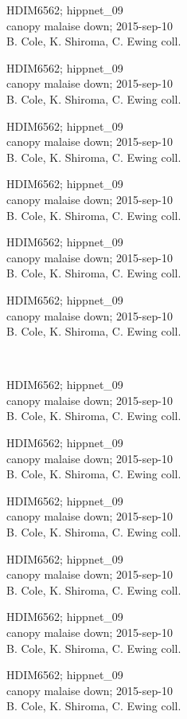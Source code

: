 \documentclass[2pt]{extarticle}
\begin{document}
\noindent
\parbox{0.16\textwidth}{\tiny \raggedright \rule[-0.3\baselineskip]{0pt}{10pt}HDIM6562; hippnet\_09\\ canopy malaise down; 2015-sep-10\\ B. Cole, K. Shiroma, C. Ewing coll.}
\parbox{0.16\textwidth}{\tiny \raggedright \rule[-0.3\baselineskip]{0pt}{10pt}HDIM6562; hippnet\_09\\ canopy malaise down; 2015-sep-10\\ B. Cole, K. Shiroma, C. Ewing coll.}
\parbox{0.16\textwidth}{\tiny \raggedright \rule[-0.3\baselineskip]{0pt}{10pt}HDIM6562; hippnet\_09\\ canopy malaise down; 2015-sep-10\\ B. Cole, K. Shiroma, C. Ewing coll.}
\parbox{0.16\textwidth}{\tiny \raggedright \rule[-0.3\baselineskip]{0pt}{10pt}HDIM6562; hippnet\_09\\ canopy malaise down; 2015-sep-10\\ B. Cole, K. Shiroma, C. Ewing coll.}
\parbox{0.16\textwidth}{\tiny \raggedright \rule[-0.3\baselineskip]{0pt}{10pt}HDIM6562; hippnet\_09\\ canopy malaise down; 2015-sep-10\\ B. Cole, K. Shiroma, C. Ewing coll.}
\parbox{0.16\textwidth}{\tiny \raggedright \rule[-0.3\baselineskip]{0pt}{10pt}HDIM6562; hippnet\_09\\ canopy malaise down; 2015-sep-10\\ B. Cole, K. Shiroma, C. Ewing coll.} \\ 
\vspace{0.001in} 

\noindent
\parbox{0.16\textwidth}{\tiny \raggedright \rule[-0.3\baselineskip]{0pt}{10pt}HDIM6562; hippnet\_09\\ canopy malaise down; 2015-sep-10\\ B. Cole, K. Shiroma, C. Ewing coll.}
\parbox{0.16\textwidth}{\tiny \raggedright \rule[-0.3\baselineskip]{0pt}{10pt}HDIM6562; hippnet\_09\\ canopy malaise down; 2015-sep-10\\ B. Cole, K. Shiroma, C. Ewing coll.}
\parbox{0.16\textwidth}{\tiny \raggedright \rule[-0.3\baselineskip]{0pt}{10pt}HDIM6562; hippnet\_09\\ canopy malaise down; 2015-sep-10\\ B. Cole, K. Shiroma, C. Ewing coll.}
\parbox{0.16\textwidth}{\tiny \raggedright \rule[-0.3\baselineskip]{0pt}{10pt}HDIM6562; hippnet\_09\\ canopy malaise down; 2015-sep-10\\ B. Cole, K. Shiroma, C. Ewing coll.}
\parbox{0.16\textwidth}{\tiny \raggedright \rule[-0.3\baselineskip]{0pt}{10pt}HDIM6562; hippnet\_09\\ canopy malaise down; 2015-sep-10\\ B. Cole, K. Shiroma, C. Ewing coll.}
\parbox{0.16\textwidth}{\tiny \raggedright \rule[-0.3\baselineskip]{0pt}{10pt}HDIM6562; hippnet\_09\\ canopy malaise down; 2015-sep-10\\ B. Cole, K. Shiroma, C. Ewing coll.} \\ 
\vspace{0.001in} 
\end{document}
